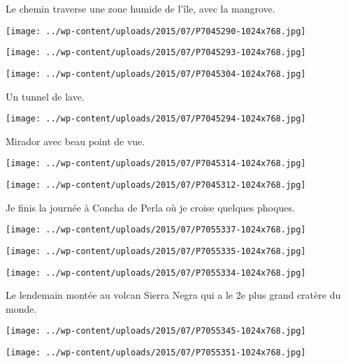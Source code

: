 Le chemin traverse une zone humide de l'île, avec la mangrove. 
\begin{center} \texttt{[image: ../wp-content/uploads/2015/07/P7045290-1024x768.jpg]} \end{center}
\begin{center} \texttt{[image: ../wp-content/uploads/2015/07/P7045293-1024x768.jpg]} \end{center}
\begin{center} \texttt{[image: ../wp-content/uploads/2015/07/P7045304-1024x768.jpg]} \end{center}
\pagebreak

Un tunnel de lave. 
\begin{center} \texttt{[image: ../wp-content/uploads/2015/07/P7045294-1024x768.jpg]} \end{center}

Mirador avec beau point de vue. 
\begin{center} \texttt{[image: ../wp-content/uploads/2015/07/P7045314-1024x768.jpg]} \end{center}
\begin{center} \texttt{[image: ../wp-content/uploads/2015/07/P7045312-1024x768.jpg]} \end{center}

Je finis la journée à Concha de Perla où je croise quelques phoques. 
\begin{center} \texttt{[image: ../wp-content/uploads/2015/07/P7055337-1024x768.jpg]} \end{center}
\begin{center} \texttt{[image: ../wp-content/uploads/2015/07/P7055335-1024x768.jpg]} \end{center}
\begin{center} \texttt{[image: ../wp-content/uploads/2015/07/P7055334-1024x768.jpg]} \end{center}
\pagebreak

Le lendemain montée au volcan Sierra Negra qui a le 2e plus grand cratère du monde. 
\begin{center} \texttt{[image: ../wp-content/uploads/2015/07/P7055345-1024x768.jpg]} \end{center}
\begin{center} \texttt{[image: ../wp-content/uploads/2015/07/P7055351-1024x768.jpg]} \end{center}
\pagebreak

